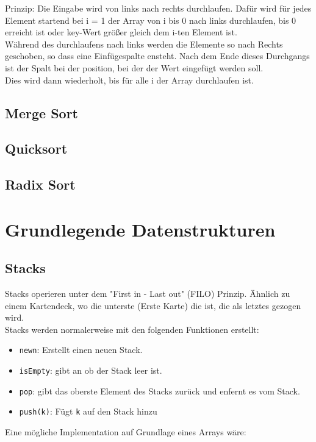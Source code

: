 \documentclass[ngerman,
color=3b,
load_common, %
boxarc,
main,
tikz,
border=3mm
]{article}
\begin{document}
Prinzip: Die Eingabe wird von links nach rechts durchlaufen. Dafür wird für jedes Element startend bei i = 1 der Array von i bis 0 nach links durchlaufen, bis 0 erreicht ist oder key-Wert größer gleich dem i-ten Element ist. \\ 
Während des durchlaufens nach links werden die Elemente so nach Rechts geschoben, so dass eine Einfügespalte ensteht. Nach dem Ende dieses Durchgangs ist der Spalt bei der position, bei der der Wert eingefügt werden soll. \\
Dies wird dann wiederholt, bis für alle i der Array durchlaufen ist.

\newpage
\subsection{Merge Sort}



\newpage
\subsection{Quicksort}



\newpage
\subsection{Radix Sort}



\newpage
\section{Grundlegende Datenstrukturen}
\subsection{Stacks}
Stacks operieren unter dem "First in - Last out" (FILO) Prinzip. Ähnlich zu einem Kartendeck, wo die unterste (Erste Karte) die ist, die als letztes gezogen wird. \\
Stacks werden normalerweise mit den folgenden Funktionen erstellt:
\begin{itemize}
    \item \texttt{new{n}}: Erstellt einen neuen Stack.
    \item \texttt{isEmpty}: gibt an ob der Stack leer ist.
    \item \texttt{pop}: gibt das oberste Element des Stacks zurück und enfernt es vom Stack.
    \item \texttt{push(k)}: Fügt \texttt{k} auf den Stack hinzu
\end{itemize}
Eine mögliche Implementation auf Grundlage eines Arrays wäre:

\end{document}
